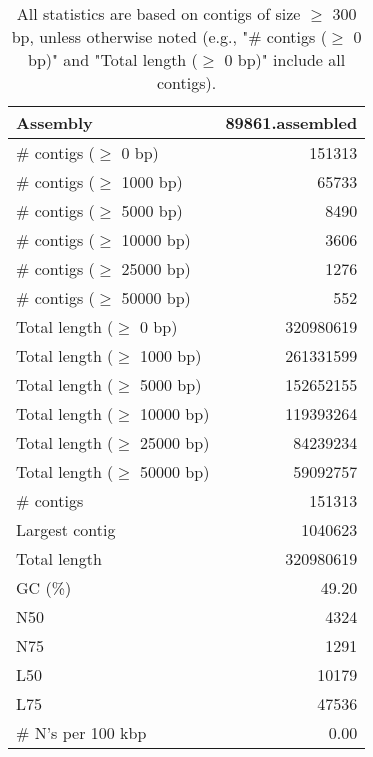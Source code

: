 \documentclass[12pt,a4paper]{article}
\begin{document}
\begin{table}[ht]
\begin{center}
\caption{All statistics are based on contigs of size $\geq$ 300 bp, unless otherwise noted (e.g., "\# contigs ($\geq$ 0 bp)" and "Total length ($\geq$ 0 bp)" include all contigs).}
\begin{tabular}{|l*{1}{|r}|}
\hline
Assembly & 89861.assembled \\ \hline
\# contigs ($\geq$ 0 bp) & 151313 \\ \hline
\# contigs ($\geq$ 1000 bp) & 65733 \\ \hline
\# contigs ($\geq$ 5000 bp) & 8490 \\ \hline
\# contigs ($\geq$ 10000 bp) & 3606 \\ \hline
\# contigs ($\geq$ 25000 bp) & 1276 \\ \hline
\# contigs ($\geq$ 50000 bp) & 552 \\ \hline
Total length ($\geq$ 0 bp) & 320980619 \\ \hline
Total length ($\geq$ 1000 bp) & 261331599 \\ \hline
Total length ($\geq$ 5000 bp) & 152652155 \\ \hline
Total length ($\geq$ 10000 bp) & 119393264 \\ \hline
Total length ($\geq$ 25000 bp) & 84239234 \\ \hline
Total length ($\geq$ 50000 bp) & 59092757 \\ \hline
\# contigs & 151313 \\ \hline
Largest contig & 1040623 \\ \hline
Total length & 320980619 \\ \hline
GC (\%) & 49.20 \\ \hline
N50 & 4324 \\ \hline
N75 & 1291 \\ \hline
L50 & 10179 \\ \hline
L75 & 47536 \\ \hline
\# N's per 100 kbp & 0.00 \\ \hline
\end{tabular}
\end{center}
\end{table}
\end{document}
